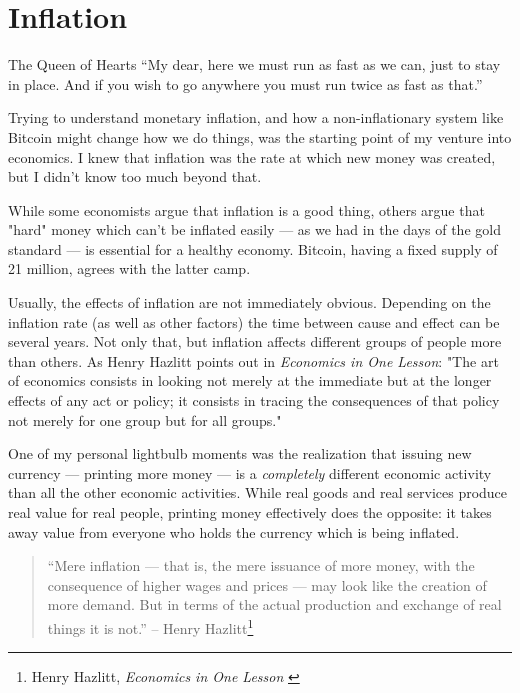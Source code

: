 \chapter{Inflation}
\label{les:9}

\begin{chapquote}{The Queen of Hearts} %
``My dear, here we must run as fast as we can, just to stay in place. And if you
wish to go anywhere you must run twice as fast as that.''
\end{chapquote}

Trying to understand monetary inflation, and how a non-inflationary
system like Bitcoin might change how we do things, was the starting
point of my venture into economics. I knew that inflation was the rate
at which new money was created, but I didn't know too much beyond that.

While some economists argue that inflation is a good thing, others argue
that "hard" money which can't be inflated easily --- as we had in the
days of the gold standard --- is essential for a healthy economy.
Bitcoin, having a fixed supply of 21 million, agrees with the latter
camp.

Usually, the effects of inflation are not immediately obvious. Depending
on the inflation rate (as well as other factors) the time between cause
and effect can be several years. Not only that, but inflation affects
different groups of people more than others. As Henry Hazlitt points out
in \textit{Economics in One Lesson}: "The art of economics consists in looking
not merely at the immediate but at the longer effects of any act or
policy; it consists in tracing the consequences of that policy not
merely for one group but for all groups."

One of my personal lightbulb moments was the realization that issuing
new currency --- printing more money --- is a \textit{completely} different
economic activity than all the other economic activities. While real
goods and real services produce real value for real people, printing
money effectively does the opposite: it takes away value from everyone
who holds the currency which is being inflated.

\begin{quotation}
``Mere inflation --- that is, the mere issuance of more money, with the
consequence of higher wages and prices --- may look like the creation
of more demand. But in terms of the actual production and exchange of
real things it is not.''
\flushright -- Henry Hazlitt\footnote{Henry Hazlitt, \textit{Economics in One Lesson} \cite{hazlitt}}
\end{quotation}

